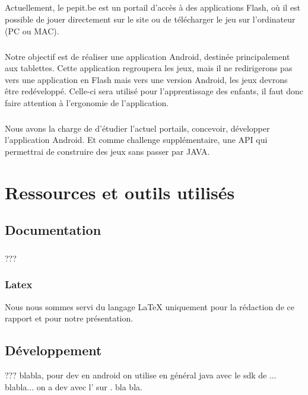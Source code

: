 \documentclass[french]{report}
\begin{document}
\paragraph{}Actuellement, le pepit.be est un portail d'accès à des applications Flash, où il est possible de jouer directement sur le site ou de télécharger le jeu sur l'ordinateur (PC ou MAC).

\paragraph{}Notre objectif est de réaliser une application Android, destinée principalement aux tablettes. Cette application regroupera les jeux, mais il ne redirigerons pas vers une application en Flash mais vers une version Android, les jeux devrons \^{e}tre redéveloppé. Celle-ci sera utilisé pour l'apprentissage des enfants, il faut donc faire attention à l'ergonomie de l'application.

\paragraph{}Nous avons la charge de d'étudier l'actuel portails, concevoir, développer l'application Android. Et comme challenge supplémentaire, une API qui permettrai de construire des jeux sans passer par JAVA.

\chapter{Ressources et outils utilisés}
\section{Documentation}
\subsection{\googleDrive}
???
\subsection{Latex}
Nous nous sommes servi du langage \LaTeX{} uniquement pour la rédaction de ce rapport et pour notre présentation.
\section{Développement}
??? blabla, pour dev en android on utilise en général java avec le sdk de \google{}... blabla... on a dev avec l'\ide{} \eclipse{} sur \linux{}. bla bla.
\end{document}
